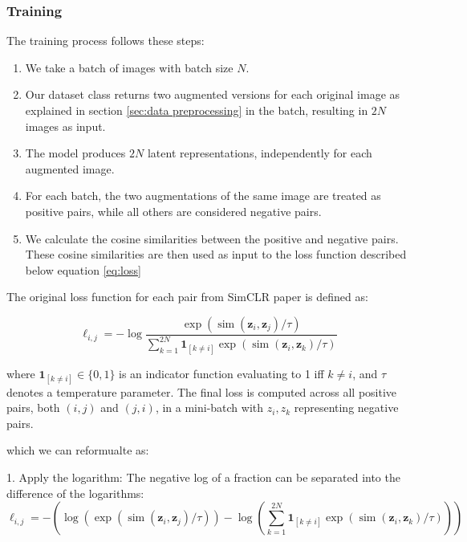 \subsubsection{Training }
The training process follows these steps:

\begin{enumerate}
    \item We take a batch of images with batch size $N$.
    
    \item Our dataset class returns two augmented versions for each original image as explained in section \ref{sec:data preprocessing} in the batch, 
    resulting in $2N$ images as input.

    \item The model produces $2N$ latent representations, independently for each augmented image.

    \item For each batch, the two augmentations of the same image are treated as positive pairs, while all others are considered negative pairs.

    \item We calculate the cosine similarities between the positive and negative pairs. These cosine similarities are then used as input to the loss
     function described below equation \ref{eq:loss}
\end{enumerate}
The original loss function for each pair from SimCLR paper \cite{chen2020simple} is defined as:

\begin{equation}
\ell_{i, j} = -\log \frac{\exp \left(\operatorname{sim}\left(\boldsymbol{z}_i, \boldsymbol{z}_j\right) / \tau\right)}{\sum_{k=1}^{2 N} \mathbf{1}_{[k \neq i]} \exp \left(\operatorname{sim}\left(\boldsymbol{z}_i, \boldsymbol{z}_k\right) / \tau\right)}
\label{eq:original}
\end{equation}

where \(\mathbf{1}_{[k \neq i]} \in \{0, 1\}\) is an indicator function evaluating to 1 iff \(k \neq i\), and \(\tau\) denotes a temperature parameter.
The final loss is computed across all positive pairs, both \((i, j)\) and \((j, i)\), in a mini-batch with $z_i, z_k$ representing negative pairs.
  
which we can reformualte as:

1. Apply the logarithm: The negative log of a fraction can be separated into the difference of the logarithms:
\[
\ell_{i, j} = -\left( \log \left(\exp \left(\operatorname{sim}\left(\boldsymbol{z}_i, \boldsymbol{z}_j\right) / \tau\right)\right) - \log\left( \sum_{k=1}^{2 N} \mathbf{1}_{[k \neq i]} \exp \left(\operatorname{sim}\left(\boldsymbol{z}_i, \boldsymbol{z}_k\right) / \tau\right) \right) \right)
\]




